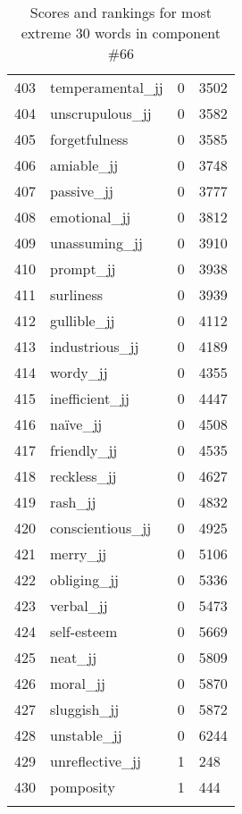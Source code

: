 \begin{longtable}[!htbp]{| rlr@{.}l |}
    403 & temperamental\_jj & 0 & 3502 \\
    404 & unscrupulous\_jj & 0 & 3582 \\
    405 & forgetfulness & 0 & 3585 \\
    406 & amiable\_jj & 0 & 3748 \\
    407 & passive\_jj & 0 & 3777 \\
    408 & emotional\_jj & 0 & 3812 \\
    409 & unassuming\_jj & 0 & 3910 \\
    410 & prompt\_jj & 0 & 3938 \\
    411 & surliness & 0 & 3939 \\
    412 & gullible\_jj & 0 & 4112 \\
    413 & industrious\_jj & 0 & 4189 \\
    414 & wordy\_jj & 0 & 4355 \\
    415 & inefficient\_jj & 0 & 4447 \\
    416 & naïve\_jj & 0 & 4508 \\
    417 & friendly\_jj & 0 & 4535 \\
    418 & reckless\_jj & 0 & 4627 \\
    419 & rash\_jj & 0 & 4832 \\
    420 & conscientious\_jj & 0 & 4925 \\
    421 & merry\_jj & 0 & 5106 \\
    422 & obliging\_jj & 0 & 5336 \\
    423 & verbal\_jj & 0 & 5473 \\
    424 & self-esteem & 0 & 5669 \\
    425 & neat\_jj & 0 & 5809 \\
    426 & moral\_jj & 0 & 5870 \\
    427 & sluggish\_jj & 0 & 5872 \\
    428 & unstable\_jj & 0 & 6244 \\
    429 & unreflective\_jj & 1 & 248 \\
    430 & pomposity & 1 & 444 \\
    \hline
    \caption{Scores and rankings for most extreme 30 words in component \#66} \\
\end{longtable}
